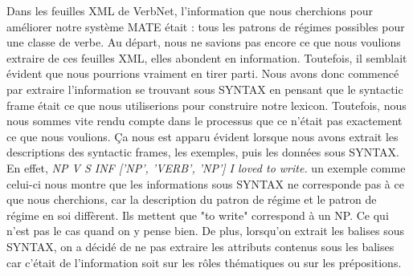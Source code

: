 Dans les feuilles XML de VerbNet, l'information que nous cherchions pour améliorer notre système MATE était : tous les patrons de régimes possibles pour une classe de verbe. Au départ, nous ne savions pas encore ce que nous voulions extraire de ces feuilles XML, elles abondent en information. Toutefois, il semblait évident que nous pourrions vraiment en tirer parti. Nous avons donc commencé par extraire l'information se trouvant sous SYNTAX en pensant que le syntactic frame était ce que nous utiliserions pour construire notre lexicon. Toutefois, nous nous sommes vite rendu compte dans le processus que ce n'était pas exactement ce que  nous voulions. Ça nous est apparu évident lorsque nous avons extrait les descriptions des syntactic frames, les exemples, puis les données sous SYNTAX. En effet, \emph{ NP V S INF ['NP', 'VERB', 'NP'] I loved to write.} un exemple comme celui-ci nous montre que les informations sous SYNTAX ne corresponde pas à ce que nous cherchions, car la description du patron de régime et le patron de régime en soi diffèrent. Ils mettent que "to write" correspond à un NP. Ce qui n'est pas le cas quand on y pense bien. De plus, lorsqu'on extrait les balises sous SYNTAX, on a décidé de ne pas extraire les attributs contenus sous les balises car c'était de l'information soit sur les rôles thématiques ou sur les prépositions. 

